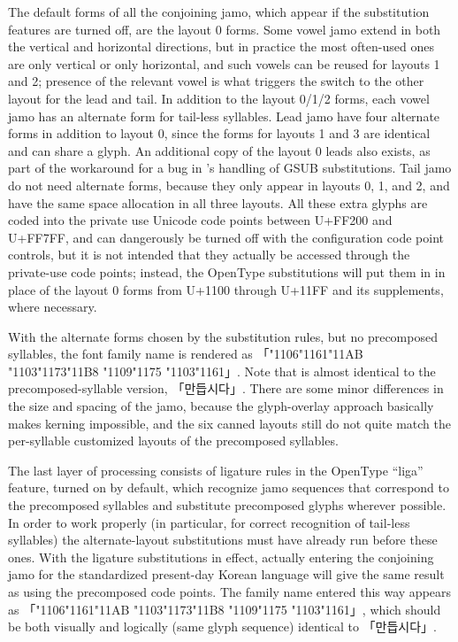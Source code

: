 \documentclass[14pt]{extarticle}
\begin{document}
The default forms of all the conjoining jamo, which appear if the
substitution features are turned off, are the layout 0 forms.  Some vowel
jamo extend in both the vertical and horizontal directions, but in practice
the most often-used ones are only vertical or only horizontal, and such
vowels can be reused for layouts 1 and 2; presence of the relevant vowel is
what triggers the switch to the other layout for the lead and tail.  In
addition to the layout 0/1/2 forms, each vowel jamo has an alternate form
for tail-less syllables.  Lead jamo have four alternate forms in addition to
layout 0, since the forms for layouts 1 and 3 are identical and can share a
glyph.  An additional copy of the layout 0 leads also exists, as part of the
workaround for a bug in \XeTeX's handling of GSUB substitutions.  Tail jamo
do not need alternate forms, because they only appear in layouts 0, 1, and
2, and have the same space allocation in all three layouts.  All these extra
glyphs are coded into the private use Unicode code points between U+FF200
and U+FF7FF, and can dangerously be turned off with the configuration code
point controls, but it is not intended that they actually be accessed
through the private-use code points; instead, the OpenType substitutions
will put them in in place of the layout 0 forms from U+1100 through U+11FF
and its supplements, where necessary.

With the alternate forms chosen by the substitution rules, but no
precomposed syllables, the font
family name is rendered as
{
「\char"1106\char"1161\char"11AB%
\char"1103\char"1173\char"11B8%
\char"1109\char"1175%
\char"1103\char"1161」}.
Note that is almost identical to the
precomposed-syllable version, {\dodum 「만듭시다」}.  There are some minor
differences in the size and spacing of the jamo, because the
glyph-overlay approach basically makes kerning impossible, and the six
canned layouts still do not quite match the per-syllable customized layouts
of the precomposed syllables.

The last layer of processing consists of ligature rules in the OpenType
``liga'' feature, turned on by default, which recognize jamo sequences that
correspond to the precomposed syllables and substitute precomposed glyphs
wherever possible.  In order to work properly (in particular, for correct
recognition of tail-less syllables) the alternate-layout substitutions must
have already run before these ones.  With the ligature substitutions in
effect, actually entering the conjoining jamo for the
standardized present-day Korean language will give the same result as using
the precomposed code points.  The family name entered this way appears as
{\dodum 「\char"1106\char"1161\char"11AB%
\char"1103\char"1173\char"11B8%
\char"1109\char"1175%
\char"1103\char"1161」}, which should be both visually and logically
(same glyph sequence) identical to {\dodum 「만듭시다」}.
\end{document}
